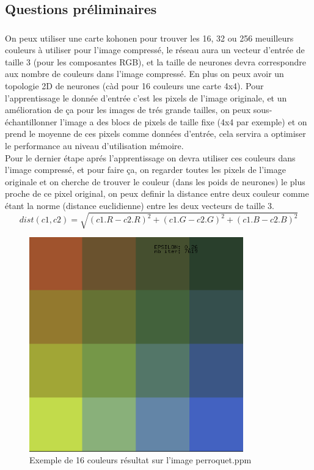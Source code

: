 \documentclass{article}
\begin{document}
\subsection{Questions préliminaires}
\subsubsection{ }
On peux utiliser une carte kohonen pour trouver les 16, 32 ou 256 meuilleurs
couleurs à utiliser pour l'image compressé, le réseau aura un vecteur d'entrée
de taille 3 (pour les composantes RGB), et la taille de neurones devra
correspondre aux nombre de couleurs dans l'image compressé. En plus on peux
avoir un topologie 2D de neurones (càd pour 16 couleurs une carte 4x4).
Pour l'apprentissage le donnée d'entrée c'est les pixels de l'image originale,
et un amélioration de ça pour les images de trés grande tailles, on peux sous-échantillonner
l'image a des blocs de pixels de taille fixe (4x4 par exemple) et on prend le
moyenne de ces pixels comme données d'entrée, cela servira a optimiser le
performance au niveau d'utilisation mémoire.\\

Pour le dernier étape aprés l'apprentissage on devra utiliser ces couleurs dans
l'image compressé, et pour faire ça, on regarder toutes les pixels de l'image
originale et on cherche de trouver le couleur (dans les poids de neurones) le
plus proche de ce pixel original, on peux definir la distance entre deux
couleur comme étant la norme (distance euclidienne) entre les deux vecteurs de
taille 3.
\begin{equation}
   dist(c1, c2) = \sqrt{(c1.R - c2.R)^2 + (c1.G - c2.G)^2 + (c1.B - c2.B)^2}
\end{equation}
\begin{figure}[H]
   \centering
   \includegraphics[width=25em]{cols.png}
   \caption{Exemple de 16 couleurs résultat sur l'image perroquet.ppm}
\end{figure}
\end{document}
